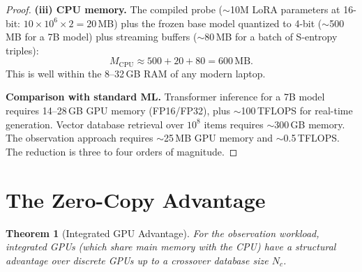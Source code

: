 \documentclass[11pt,twocolumn,a4paper]{article}
\newtheorem{theorem}{Theorem}[section]
\begin{document}
\begin{proof}
\textbf{(iii) CPU memory.}
The compiled probe ($\sim$10M LoRA parameters at 16-bit:
$10 \times 10^6 \times 2 = 20$\,MB) plus the frozen base model
quantized to 4-bit ($\sim$500\,MB for a 7B model) plus streaming
buffers ($\sim$80\,MB for a batch of S-entropy triples):
\begin{equation}
M_{\mathrm{CPU}} \approx 500 + 20 + 80 = 600\,\text{MB}.
\end{equation}
This is well within the 8--32\,GB RAM of any modern laptop.

\textbf{Comparison with standard ML.} Transformer inference for a
7B model requires 14--28\,GB GPU memory (FP16/FP32), plus
$\sim$100\,TFLOPS for real-time generation. Vector database retrieval
over $10^8$ items requires $\sim$300\,GB memory. The observation
approach requires $\sim$25\,MB GPU memory and $\sim$0.5\,TFLOPS.
The reduction is three to four orders of magnitude. \qedhere
\end{proof}



\section{The Zero-Copy Advantage}
\label{sec:zerocopy}

\begin{theorem}[Integrated GPU Advantage]
\label{thm:zerocopy}
For the observation workload, integrated GPUs (which share main memory
with the CPU) have a structural advantage over discrete GPUs up to
a crossover database size $N_c$.
\end{theorem}
\end{document}
